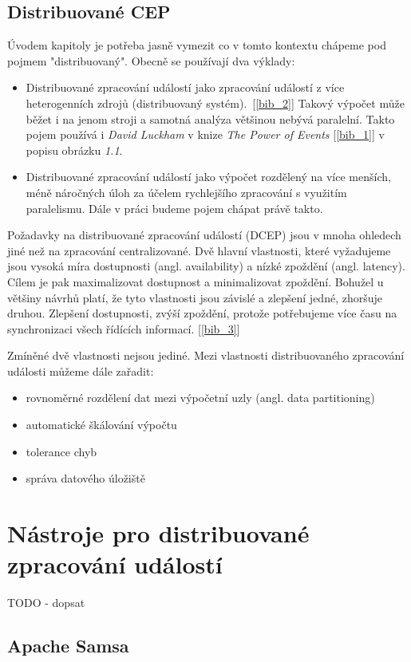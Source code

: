 \documentclass[
  digital, %
  table,   %
  nolof,     %
  nolot,     %
  oneside, %
  nocover,
  monochrome,
  12pt
]{fithesis3}
\begin{document}
\section{Distribuované CEP}
Úvodem kapitoly je potřeba jasně vymezit co v tomto kontextu chápeme pod pojmem "distribuovaný". Obecně se používají dva výklady:
\begin{itemize}
  \item Distribuované zpracování událostí jako zpracování událostí z více heterogenních zdrojů (distribuovaný systém).~[\ref{bib_2}] Takový výpočet může běžet i na jenom stroji a samotná analýza většinou nebývá paralelní. Takto pojem používá i \textit{David Luckham} v knize \textit{The Power of Events} [\ref{bib_1}] v popisu obrázku \textit{1.1}.
  \item Distribuované zpracování událostí jako výpočet rozdělený na více menších, méně náročných úloh za účelem rychlejšího zpracování s využitím paralelismu. Dále v práci budeme pojem chápat právě takto.
\end{itemize}

Požadavky na distribuované zpracování událostí (DCEP) jsou v mnoha ohledech jiné než na zpracování centralizované. Dvě hlavní vlastnosti, které vyžadujeme jsou vysoká míra dostupnosti (angl. availability) a nízké zpoždění (angl. latency). Cílem je pak maximalizovat dostupnost a minimalizovat zpoždění. Bohužel u většiny návrhů platí, že tyto vlastnosti jsou závislé a zlepšení jedné, zhoršuje druhou. Zlepšení dostupnosti, zvýší zpoždění, protože potřebujeme více času na synchronizaci všech řídících informací. [\ref{bib_3}]

Zmíněné dvě vlastnosti nejsou jediné. Mezi vlastnosti distribuovaného zpracování události můžeme dále zařadit:
\begin{itemize}
  \item rovnoměrné rozdělení dat mezi výpočetní uzly (angl. data partitioning)
  \item automatické škálování výpočtu
  \item tolerance chyb
  \item správa datového úložiště
\end{itemize}

\chapter{Nástroje pro distribuované zpracování událostí}
TODO - dopsat
\section{Apache Samsa}
\end{document}

